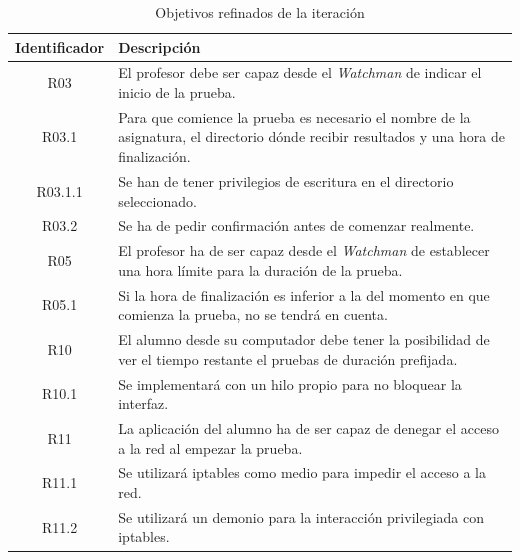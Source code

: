 \begin{table}
    \begin{tabular}{|c|p{10cm}|}
    \hline
    \textbf{Identificador} & \textbf{Descripción}
    \\ \hline

    R03 & El profesor debe ser capaz desde el \emph{Watchman} de indicar el inicio de la prueba.
    \\ \hline

    R03.1 & Para que comience la prueba es necesario el nombre de la asignatura, el directorio dónde recibir resultados y una hora de finalización.
    \\ \hline

    R03.1.1 & Se han de tener privilegios de escritura en el directorio seleccionado.
    \\ \hline

    R03.2 & Se ha de pedir confirmación antes de comenzar realmente.
    \\ \hline

    R05 & El profesor ha de ser capaz desde el \emph{Watchman} de establecer una hora límite para la duración de la prueba.
    \\ \hline

    R05.1 & Si la hora de finalización es inferior a la del momento en que comienza la prueba, no se tendrá en cuenta.
    \\ \hline

    R10 & El alumno desde su computador debe tener la posibilidad de ver el tiempo restante el pruebas de duración prefijada.
    \\ \hline

    R10.1 & Se implementará con un hilo propio para no bloquear la interfaz.
    \\ \hline

    R11 & La aplicación del alumno ha de ser capaz de denegar el acceso a la red al empezar la prueba.
    \\ \hline

    R11.1 & Se utilizará iptables como medio para impedir el acceso a la red.
    \\ \hline

    R11.2 & Se utilizará un demonio para la interacción privilegiada con iptables.
    \\ \hline

    \end{tabular}
    \caption{Objetivos refinados de la iteración}
    \label{tabla:objetivosRefinadosIteracion}
\end{table}


